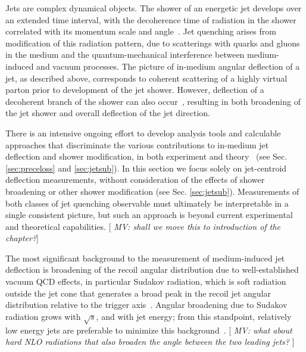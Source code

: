 Jets are complex dynamical objects. The shower of an energetic jet develops over an extended time interval, with the decoherence time of radiation in the shower correlated with its momentum scale and angle~\cite{Andrews:2018jcm}. Jet quenching arises from modification of this radiation pattern, due to scatterings with quarks and gluons in the medium and the quantum-mechanical interference between medium-induced and vacuum processes. The picture of in-medium angular deflection of a jet, as described above, corresponds to coherent scattering of a highly virtual parton prior to development of the jet shower. However, deflection of a decoherent branch of the shower can also occur~\cite{DEramo:2018eoy}, resulting in both broadening of the jet shower and overall deflection of the jet direction. 

There is an intensive ongoing effort to develop analysis tools and calculable approaches that discriminate the various contributions to in-medium jet deflection and shower modification, in both experiment and theory~\cite{Andrews:2018jcm} (see Sec. \ref{sec:preceloss} and \ref{sec:jetsub}). In this section we focus solely on jet-centroid deflection measurements, without consideration of the effects of shower broadening or other shower modification (see Sec. \ref{sec:jetsub}). Measurements of both classes of jet quenching observable must ultimately be interpretable in a single consistent picture, but such an approach is beyond current experimental and theoretical capabilities. [{\it \color{blue} MV: shall we move this to introduction of the chapter?\color{black}}]

The most significant background to the measurement of medium-induced jet deflection is broadening of the recoil angular distribution due to well-established vacuum QCD effects, in particular Sudakov radiation, which is soft radiation outside the jet cone that generates a broad peak in the recoil jet angular distribution relative to the trigger axis~\cite{Chen:2016vem,Mueller:2016xoc}. Angular broadening due to Sudakov radiation grows with $\sqrt{s}$, and with jet energy; from this standpoint, relatively low energy jets are preferable to minimize this background~\cite{Chen:2016vem}.
[{\it \color{blue} MV: what about hard NLO radiations that also broaden the angle between the two leading jets?\color{black} }]

